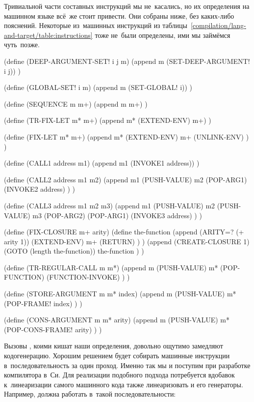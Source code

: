 Тривиальной части составных инструкций мы не~касались, но их определения
на машинном языке всё~же стоит привести. Они собраны ниже, без каких-либо
пояснений. Некоторые из~машинных инструкций из
таблицы~\ref{compilation/lang-and-target/table:instructions} тоже не~были
определены, ими мы займёмся чуть~позже.

\begin{code:lisp}
(define (DEEP-ARGUMENT-SET! i j m)
  (append m (SET-DEEP-ARGUMENT! i j)) )

(define (GLOBAL-SET! i m)
  (append m (SET-GLOBAL! i)) )

(define (SEQUENCE m m+)
  (append m m+) )

(define (TR-FIX-LET m* m+)
  (append m* (EXTEND-ENV) m+) )

(define (FIX-LET m* m+)
  (append m* (EXTEND-ENV)
          m+ (UNLINK-ENV) ) )

(define (CALL1 address m1)
  (append m1 (INVOKE1 address)) )

(define (CALL2 address m1 m2)
  (append m1 (PUSH-VALUE)
          m2 (POP-ARG1)
          (INVOKE2 address) ) )

(define (CALL3 address m1 m2 m3)
  (append m1 (PUSH-VALUE)
          m2 (PUSH-VALUE)
          m3 (POP-ARG2) (POP-ARG1)
          (INVOKE3 address) ) )

(define (FIX-CLOSURE m+ arity)
  (define the-function
    (append (ARITY=? (+ arity 1))
            (EXTEND-ENV) m+
            (RETURN) ) )
  (append (CREATE-CLOSURE 1)
          (GOTO (length the-function))
          the-function ) )

(define (TR-REGULAR-CALL m m*)
  (append m (PUSH-VALUE)
          m* (POP-FUNCTION)
          (FUNCTION-INVOKE) ) )

(define (STORE-ARGUMENT m m* index)
  (append m (PUSH-VALUE)
          m* (POP-FRAME! index) ) )

(define (CONS-ARGUMENT m m* arity)
  (append m (PUSH-VALUE)
          m* (POP-CONS-FRAME! arity) ) )
\end{code:lisp}

Вызовы , коими кишат наши определения, довольно ощутимо замедляют
кодогенерацию. Хорошим решением будет собирать машинные инструкции
в~последовательность за один проход. Именно так мы и поступим при разработке
компилятора в~Си.  Для реализации подобного подхода
потребуется вдобавок к~линеаризации самого машинного кода также линеаризовать и
его генераторы. Например,  должна работать в~такой последовательности:

